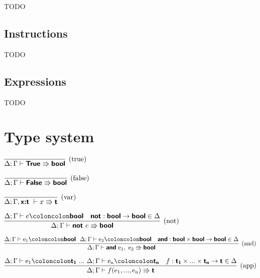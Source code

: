 \documentclass[a4paper]{article}
\newcommand{\kw}[1]{\textsf{\textbf{#1}}}
\newcommand{\colcol}{\coloncolon}
\newcommand{\yield}{\Rrightarrow}
\begin{document}
TODO

\subsection{Instructions}

TODO

\subsection{Expressions}

TODO

\section{Type system}

\vspace{1\baselineskip}

$\infer[\text{(true)}]%
{\Delta;\Gamma \vdash \kw{True} \yield \kw{bool}}%
{}$

\vspace{3\baselineskip}

$\infer[\text{(false)}]%
{\Delta;\Gamma \vdash \kw{False} \yield \kw{bool}}%
{}$

\vspace{3\baselineskip}


$\infer[\text{(var)}]%
{\Delta;\Gamma, \kw{x:t}~ \vdash x \yield \kw{t}}%
{}$

\vspace{3\baselineskip}

$\infer[\text{(not)}]%
{\Delta;\Gamma \vdash \kw{not}~e \yield \kw{bool}}%
{\Delta;\Gamma \vdash e \colcol \kw{bool} & \kw{not}:\kw{bool}\rightarrow\kw{bool}\in \Delta}$

\vspace{3\baselineskip}

$\infer[\text{(and)}]%
{\Delta;\Gamma \vdash \kw{and}~\textrm{e}_\textrm{1},~\textrm{e}_\textrm{2} \yield \kw{bool}}%
{\Delta;\Gamma \vdash \textrm{e}_\textrm{1} \colcol \kw{bool}~~ \Delta;\Gamma \vdash\textrm{e}_\textrm{2} \colcol \kw{bool} & \kw{and}:\kw{bool}\times\kw{bool}\rightarrow\kw{bool}\in \Delta}$

\vspace{3\baselineskip}

$\infer[\text{(app)}]%
{\Delta;\Gamma \vdash f(\textrm{e}_\textrm{1},...,\textrm{e}_\textrm{n}) \yield \kw{t}}%
{\Delta;\Gamma \vdash \textrm{e}_\textrm{1} \colcol \kw{t}_\kw{1}~...~ \Delta;\Gamma \vdash \textrm{e}_\textrm{n} \colcol \kw{t}_\kw{n} & f:\kw{t}_\kw{1}\times ... \times\kw{t}_\kw{n}\rightarrow\kw{t}\in \Delta}$
\end{document}
